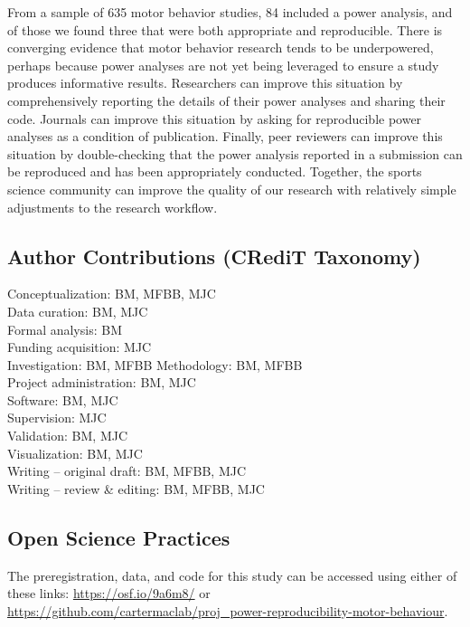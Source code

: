 \documentclass[
  doc, donotrepeattitle,floatsintext]{apa7}
\begin{document}
From a sample of 635 motor behavior studies, 84 included a power analysis, and of those we found three that were both appropriate and reproducible. There is converging evidence that motor behavior research tends to be underpowered, perhaps because power analyses are not yet being leveraged to ensure a study produces informative results. Researchers can improve this situation by comprehensively reporting the details of their power analyses and sharing their code. Journals can improve this situation by asking for reproducible power analyses as a condition of publication. Finally, peer reviewers can improve this situation by double-checking that the power analysis reported in a submission can be reproduced and has been appropriately conducted. Together, the sports science community can improve the quality of our research with relatively simple adjustments to the research workflow.

\vspace{5ex}

\hypertarget{author-contributions-credit-taxonomy}{%
\subsection{Author Contributions (CRediT Taxonomy)}\label{author-contributions-credit-taxonomy}}

\noindent Conceptualization: BM, MFBB, MJC\\
Data curation: BM, MJC\\
Formal analysis: BM\\
Funding acquisition: MJC\\
Investigation: BM, MFBB
Methodology: BM, MFBB\\
Project administration: BM, MJC\\
Software: BM, MJC\\
Supervision: MJC\\
Validation: BM, MJC\\
Visualization: BM, MJC\\
Writing -- original draft: BM, MFBB, MJC\\
Writing -- review \& editing: BM, MFBB, MJC

\hypertarget{open-science-practices}{%
\subsection{Open Science Practices}\label{open-science-practices}}

\noindent The preregistration, data, and code for this study can be accessed using either of these links: \url{https://osf.io/9a6m8/} or \url{https://github.com/cartermaclab/proj_power-reproducibility-motor-behaviour}.
\end{document}
